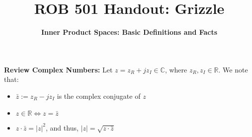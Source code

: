 \documentclass[11pt,twoside]{nsf_jwg}
\begin{document}

	\title{\Large \bf ROB 501 Handout: Grizzle}
	\author{{\bf Inner Product Spaces: Basic Definitions and Facts}}
	\date{}
	\maketitle
	
	\Large




\section*{}			
\label{inner_product_spaces}
\noindent \textbf{Review Complex Numbers:} Let $z=z_R + j z_I \in {\mathbb C}$, where $z_R, z_I \in {\mathbb R}$. We note that:
\begin{itemize}
\item $\bar{z} := z_R - j z_I$ is the complex conjugate of $z$
\item $z \in {\mathbb  R} \Leftrightarrow z = \bar{z}$
\item $z \cdot \bar{z} = |z|^2$, and thus, $|z|=\sqrt{z \cdot \bar{z} }$
\end{itemize}
\end{document}
